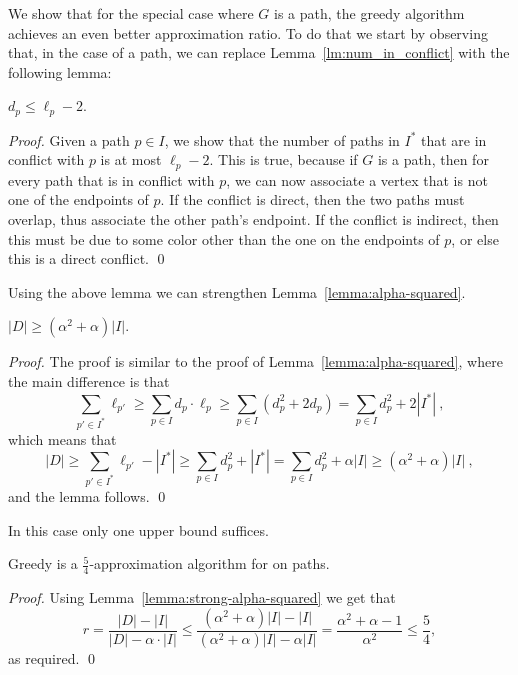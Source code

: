 We show that for the special case where $G$ is a path, the greedy
algorithm achieves an even better approximation ratio.  To do that we
start by observing that, in the case of a path, we can replace
Lemma~\ref{lm:num_in_conflict} with the following lemma:

\begin{lemma}
$d_p \leq \ell_p - 2$.
\end{lemma}
\begin{proof}
Given a path $p \in I$, we show that the number of paths in $I^*$ that
are in conflict with $p$ is at most $\ell_p - 2$.  This is true,
because if $G$ is a  path, then for every path that is in
conflict with $p$, we can now associate a vertex that is not one of
the endpoints of $p$.  If the conflict is direct, then the two paths
must overlap, thus associate the other path's endpoint.  If the
conflict is indirect, then this must be due to some color other than
the one on the endpoints of $p$, or else this is a direct conflict.
\qed{}\end{proof}

Using the above lemma we can strengthen
Lemma~\ref{lemma:alpha-squared}.

\begin{lemma}
\label{lemma:strong-alpha-squared}
$|D| \geq (\alpha^2+\alpha)|I|$.
\end{lemma}
\begin{proof}
The proof is similar to the proof of Lemma~\ref{lemma:alpha-squared},
where the main difference is that
\[
\sum_{p' \in I^*} \ell_{p'}
\geq \sum_{p \in I} d_p \cdot \ell_p
\geq \sum_{p \in I} (d_p^2 + 2d_p)
=    \sum_{p \in I} d_p^2 + 2|I^*|
~,
\]
which means that 
\[
|D| 
\geq \sum_{p' \in I^*} \ell_{p'} - |I^*|
\geq \sum_{p \in I} d_p^2 + |I^*|
=    \sum_{p \in I} d_p^2 + \alpha |I|
\geq (\alpha^2 + \alpha) |I|
~,
\]
and the lemma follows.
\qed{}\end{proof}

In this case only one upper bound suffices.

\begin{theorem}
Greedy is a $\frac{5}{4}$-approximation algorithm for
\TWOCR{} on paths.
\end{theorem}
\begin{proof}
Using Lemma~\ref{lemma:strong-alpha-squared} we get that
\[
r	=    
\frac{|D| - |I|}{|D| - \alpha \cdot |I|}
\leq 
\frac{
	(\alpha^2 + \alpha)|I| - |I|
}{
	(\alpha^2 + \alpha)|I| - \alpha |I|
}
=    \frac{\alpha^2 + \alpha - 1}{\alpha^2}
\leq \frac{5}{4}
,
\]
as required.
\qed{}\end{proof}

